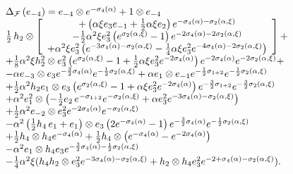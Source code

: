 \documentclass[a4paper,12pt,showkeys]{article}
\begin{document}
\[
\begin{array}{l}
\Delta {\sf _{{\cal F}}}\left(  e_{-4}\right) = e_{-4}\otimes e^{-{\bf %
 \sigma }_{4} (\alpha) }+1\otimes  e_{-4}
 \\
\frac{1}{2}\,  h_2 \otimes \left[
\begin{array}{c}
 + \left( \alpha \xi  e_3   e_{-1}
 +\frac{1}{2}\alpha \xi   e_2\right) e^{-{\bf %
 \sigma }_{4} (\alpha) -{\bf  \sigma }_{2} (\alpha, \xi ) }
 \\
-\frac{1}{2}\alpha ^{2}\xi  e_3 ^{2}\left( e^{{\bf  \sigma }_{2}
(\alpha, \xi ) }-1\right) e^{-2{\bf  \sigma }_{4} (\alpha)
-2{\bf  \sigma }_{2} (\alpha, \xi ) }
\\
+\alpha ^{2}\xi  e_3 ^{2}\left( e^{-3{\bf  \sigma }_{4} (\alpha) -{\bf \sigma }%
_{2}(\alpha,\xi)}-\frac{1}{4}\alpha \xi  e_3 ^{2}e^{-4{\bf  \sigma
}_{4} (\alpha) -2{\bf  \sigma }_{2} (\alpha, \xi ) }\right)
\end{array}%
\right] +
\\
+\frac{1}{8}\alpha ^{2}\xi  h_2 ^{2}\otimes  e_3 ^{2}\left(
e^{{\bf  \sigma }_{2} (\alpha, \xi ) }-1+\frac{1}{2}\alpha \xi
 e_3 ^{2}e^{-2{\bf  \sigma }_{4} (\alpha) }\right)
e^{-2{\bf  \sigma }_{4} (\alpha) }e^{-2{\bf  \sigma }_{2}
(\alpha, \xi ) }+
\\
- \alpha e_{-3} \otimes  e_3 e^{-\frac{3}{2}{\bf  \sigma }_{4} (\alpha) }e^{-\frac{1}{2}%
{\bf  \sigma }_{2} (\alpha, \xi ) }+\alpha   e_1 \otimes
e_{-1} e^{-\frac{1}{2}{\bf \sigma }%
_{1+2}}e^{-\frac{1}{2}{\bf  \sigma }_{2} (\alpha, \xi ) }
\\
+ \frac{1}{2}\alpha ^{2} h_2   e_1 \otimes  e_3 \left( e^{{\bf
\sigma }_{2} (\alpha, \xi ) }-1+\alpha
\xi  e_3 ^{2}e^{-2{\bf  \sigma }_{4} (\alpha) }\right) e^{-\frac{3}{2}{\bf \sigma }%
_{1+2}}e^{-\frac{3}{2}{\bf  \sigma }_{2} (\alpha, \xi ) }
\\
+\alpha ^{2}  e_1 ^{2}\otimes
\left( -\frac{1}{2} e_2
\,
 e^{-{\bf \sigma }%
_{1+2}}e^{-{\bf  \sigma }_{2} (\alpha, \xi ) }+
\alpha  e_3 ^{2}e^{-3{\bf  \sigma }_{4} (\alpha) -%
{\bf  \sigma }_{2} (\alpha, \xi ) }\right)
\\
+ \frac{1}{2}\alpha ^{2} e_{-2} \otimes  e_3 ^{2}e^{-2{\bf  \sigma }_{4} (\alpha) }e^{-%
{\bf  \sigma }_{2} (\alpha, \xi ) }
\\
-\alpha^2 \left( \frac{1}{2} h_4 \, e_1 + e_1\right)
 \otimes  e_3 \left( 2e^{-{\bf %
 \sigma }_{4} (\alpha) }-1\right) e^{-\frac{3}{2}{\bf  \sigma }_{4}
 (\alpha) }e^{-\frac{1}{2}%
{\bf  \sigma }_{2} (\alpha, \xi ) }
\\
+\frac{1}{2} h _{4}\otimes  h _{4}e^{-{\bf  \sigma }_{4} (\alpha)
}+
 \frac{1}{2} h _{4}\otimes \left( e^{-%
{\bf  \sigma }_{4} (\alpha) }-e^{-2{\bf  \sigma }_{4} (\alpha)
}\right)
\\
- \alpha ^{2}  e_1 \otimes  h _{4} e_3 e^{-\frac{3}{2}{\bf  \sigma }_{4} (\alpha) -%
\frac{1}{2}{\bf  \sigma }_{2} (\alpha, \xi ) }
\\
 - \frac{1}{4}\alpha ^{2}\xi(  h _{4} h_2
 \otimes  e_3 ^{2}e^{-3{\bf  \sigma }_{4}
(\alpha) -{\bf %
 \sigma }_{2} (\alpha, \xi ) }
 +  h_2 \otimes  h _{4} e_3 ^{2}e^{-2{\bf %
+ \sigma }_{4} (\alpha) -{\bf  \sigma }_{2} (\alpha, \xi ) }).%
\end{array}%
\]%
\end{document}
